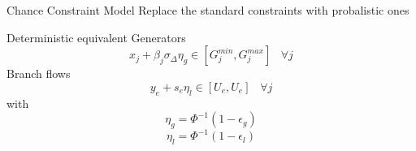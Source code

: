 \begin{frame}{Chance Constraint Model}
Replace the standard constraints with probalistic ones \footnotemark \footnotemark
\pause
\bi
\item Deterministic equivalent
\ei
Generators 
\[ x_j + \beta_j \sigma_\Delta \eta_g \in \left[ G^{min}_j, G^{max}_j \right] \hspace{10pt} \forall j     \]
\pause
Branch flows
\[ y_e + s_e \eta_l \in \left[ U_e, U_e \right] \hspace{10pt} \forall j    \]
\pause
with
\[ \eta_g = \Phi^{-1}(1 - \epsilon_g) \]
\[ \eta_l = \Phi^{-1}(1 - \epsilon_l) \]








\end{frame}


